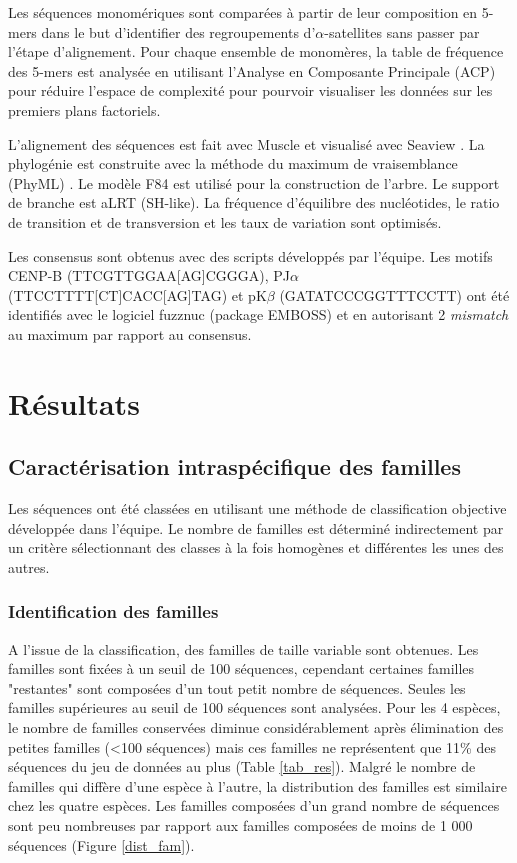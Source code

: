 \documentclass[12pt,a4paper]{article}
\begin{document}
Les séquences monomériques sont comparées à partir de leur composition en 5-mers dans le but d'identifier des regroupements d'$\alpha$-satellites sans passer par l'étape d'alignement. Pour chaque ensemble de monomères,	la table de fréquence des 5-mers est analysée en utilisant l'Analyse en Composante Principale (ACP) pour réduire l'espace de complexité pour pourvoir visualiser les données sur les premiers plans factoriels.
	
L'alignement des séquences est fait avec Muscle \cite{Edgar2004} et visualisé avec Seaview \cite{Galtier1996}. La phylogénie est construite avec la méthode du maximum de vraisemblance (PhyML) \cite{Guindon2009}. Le modèle F84 est utilisé pour la construction de l'arbre. Le support de branche est aLRT (SH-like). La fréquence d'équilibre des nucléotides, le ratio de transition et de transversion et les taux de variation sont optimisés.

Les consensus sont obtenus avec des scripts développés par l'équipe. Les motifs CENP-B (TTCGTTGGAA[AG]CGGGA), PJ$\alpha$ (TTCCTTTT[CT]CACC[AG]TAG) et pK$\beta$ (GATATCCCGGTTTCCTT) ont été identifiés avec le logiciel fuzznuc (package EMBOSS) \cite{Rice2000} et en autorisant 2 \textit{mismatch} au maximum par rapport au consensus.

\section{Résultats}
	\subsection{Caractérisation intraspécifique des familles}
	Les séquences ont été classées en utilisant une méthode de classification objective développée dans l'équipe. Le nombre de familles est déterminé indirectement par un critère sélectionnant des classes à la fois homogènes et différentes les unes des autres.
	
			\subsubsection{Identification des familles}
			
			A l'issue de la classification, des familles de taille variable sont obtenues. Les familles sont fixées à un seuil de 100 séquences, cependant certaines familles "restantes" sont composées d'un tout petit nombre de séquences. Seules les familles supérieures au seuil de 100 séquences sont analysées. Pour les 4 espèces, le nombre de familles conservées diminue considérablement après élimination des petites familles (<100 séquences) mais ces familles ne représentent que 11\% des séquences du jeu de données au plus (Table \ref{tab_res}).  Malgré le nombre de familles qui diffère d'une espèce à l'autre, la distribution des familles est similaire chez les quatre espèces. Les familles composées d'un grand nombre de séquences sont peu nombreuses par rapport aux familles composées de moins de 1 000 séquences (Figure \ref{dist_fam}). 
\end{document}
